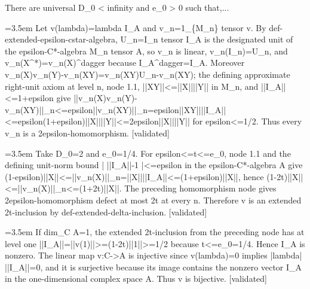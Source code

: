 \documentclass{article}
\newcommand{\step}[1]{\par\noindent\hangindent=3.5em\hangafter=1%
  \makebox[3.5em][l]{\textbf{#1.}}}
\newcommand{\steptag}[1]{\hfill{\small\textsf{[#1]}}}
\begin{document}
\begin{proofbox}{There are universal D\_0 < infinity and e\_0 > 0 such that,...}
\step{1.5} Let v(lambda)=lambda I\_A and v\_n=1\_\{M\_n\} tensor v. By def-extended-epsilon-cstar-algebra, U\_n=I\_n tensor I\_A is the designated unit of the epsilon-C*-algebra M\_n tensor A, so v\_n is linear, v\_n(I\_n)=U\_n, and v\_n(X\textasciicircum{}*)=v\_n(X)\textasciicircum{}dagger because I\_A\textasciicircum{}dagger=I\_A. Moreover v\_n(X)v\_n(Y)-v\_n(XY)=v\_n(XY)U\_n-v\_n(XY); the defining approximate right-unit axiom at level n, node 1.1, ||XY||<=||X||||Y|| in M\_n, and ||I\_A||<=1+epsilon give ||v\_n(X)v\_n(Y)-v\_n(XY)||\_n<=epsilon||v\_n(XY)||\_n=epsilon||XY||||I\_A||<=epsilon(1+epsilon)||X||||Y||<=2epsilon||X||||Y|| for epsilon<=1/2. Thus every v\_n is a 2epsilon-homomorphism. \steptag{validated} \\[4pt]
\step{1.6} Take D\_0=2 and e\_0=1/4. For epsilon<=t<=e\_0, node 1.1 and the defining unit-norm bound | ||I\_A||-1 |<=epsilon in the epsilon-C*-algebra A give (1-epsilon)||X||<=||v\_n(X)||\_n=||X||||I\_A||<=(1+epsilon)||X||, hence (1-2t)||X||<=||v\_n(X)||\_n<=(1+2t)||X||. The preceding homomorphism node gives 2epsilon-homomorphism defect at most 2t at every n. Therefore v is an extended 2t-inclusion by def-extended-delta-inclusion. \steptag{validated} \\[4pt]
\step{1.7} If dim\_C A=1, the extended 2t-inclusion from the preceding node has at level one ||I\_A||=||v(1)||>=(1-2t)||1||>=1/2 because t<=e\_0=1/4. Hence I\_A is nonzero. The linear map v:C->A is injective since v(lambda)=0 implies |lambda| ||I\_A||=0, and it is surjective because its image contains the nonzero vector I\_A in the one-dimensional complex space A. Thus v is bijective. \steptag{validated} \\[4pt]
\end{proofbox}
\end{document}
